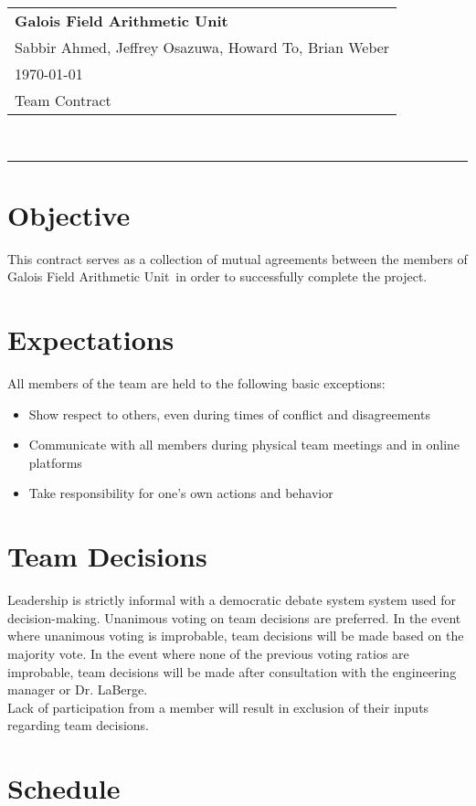 \documentclass[paper=usletter, fontsize=12pt]{article}
\newcommand{\team}{Galois Field Arithmetic Unit}
\newcommand{\Sabbir}{Sabbir Ahmed}
\newcommand{\Jeffrey}{Jeffrey Osazuwa}
\newcommand{\Howard}{Howard To}
\newcommand{\Brian}{Brian Weber}
\newcommand{\documentinfo}[4]{
    \begin{centering}
        \parbox{2in}{
        \begin{spacing}{1}
            \begin{flushleft}
                \begin{tabular}{l}
                    \large\textbf{#1} \\
                    #2 \\
                    #3 \\
                    #4 \\
                \end{tabular}\\
                \rule{\textwidth}{1pt}
            \end{flushleft}
        \end{spacing}
        }
    \end{centering}
}
\begin{document}
    \documentinfo{\team~}{\Sabbir, \Jeffrey, \Howard, \Brian}{\today}{Team Contract}
    \vspace{-0.3in}

    \section{Objective}

        This contract serves as a collection of mutual agreements between the members of \team \ in order to successfully complete the project.

    \section{Expectations}

        All members of the team are held to the following basic exceptions:

        \begin{itemize}

            \item Show respect to others, even during times of conflict and disagreements
            \item Communicate with all members during physical team meetings and in online platforms
            \item Take responsibility for one’s own actions and behavior

        \end{itemize}

    \section{Team Decisions}

        Leadership is strictly informal with a democratic debate system system used for decision-making. Unanimous voting on team decisions are preferred. In the event where unanimous voting is improbable, team decisions will be made based on the majority vote. In the event where none of the previous voting ratios are improbable, team decisions will be made after consultation with the engineering manager or Dr. LaBerge. \\

        Lack of participation from a member will result in exclusion of their inputs regarding team decisions. 

    \section{Schedule}
\end{document}
